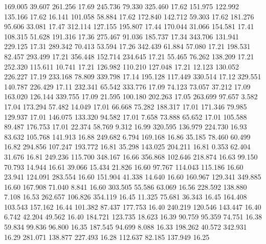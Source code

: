  169.005   39.607  261.256        17.69
 245.736   79.330  325.460        17.62
 151.975  122.992  135.166        17.62
  16.141  101.058   58.884        17.62
 172.840  142.712   59.303        17.62
 181.276   95.606   33.081        17.47
 312.114  127.155  195.807        17.44
 170.044   31.066  154.581        17.41
 108.315   51.628  191.316        17.36
 275.467   91.036  185.737        17.34
 343.706  131.941  229.125        17.31
 289.342   70.413   53.594        17.26
 342.439   61.884   57.080        17.21
 198.531   82.457  293.499        17.21
 356.448  152.714  234.645        17.21
  55.465   76.262  138.209        17.21
 252.320  115.611   10.741        17.21
 126.982  110.210  127.048        17.21
  12.123  130.052  226.227        17.19
 233.168   78.809  339.798        17.14
 195.128  117.449  330.514        17.12
 329.551  140.787  226.429        17.11
 232.341   65.542  333.776        17.09
  74.123   73.057   37.212        17.09
 163.020  126.144  339.755        17.09
  21.595  100.180  202.263        17.05
 263.699   97.657    3.582        17.04
 173.294   57.482   14.049        17.01
  66.668   75.282  188.317        17.01
 171.346   79.985  129.937        17.01
 146.075  133.320   94.582        17.01
   7.658   73.888   65.652        17.01
 105.588   89.487  176.753        17.01
  22.374   58.769    9.312        16.99
 320.595  136.979  224.730        16.93
  83.632  105.768  141.913        16.88
 249.682    6.794  169.168        16.86
  35.185   78.460   60.499        16.82
 294.856  107.247  193.772        16.81
  35.298  143.025  204.211        16.81
   0.353   62.404   31.676        16.81
 249.236  115.700  348.167        16.66
 356.868  102.646  218.874        16.63
  99.150   70.793   14.944        16.61
  39.066   15.434   21.826        16.60
  97.767  114.043  115.186        16.60
  23.941  124.091  283.554        16.60
 151.904   41.338   14.640        16.60
 160.967  129.341  349.885        16.60
 167.908   71.040    8.841        16.60
 303.505   55.586   63.069        16.56
 228.592  138.880    7.108        16.53
 262.657  106.826  354.119        16.45
  11.325   75.681   36.343        16.45
 164.408  103.543  157.162        16.44
 101.382   87.437  177.753        16.40
 240.219  120.546  143.447        16.40
   6.742   42.204   49.562        16.40
 184.721  123.735   18.623        16.39
  90.759   95.359   74.751        16.38
  59.834   99.836   96.800        16.35
 187.545   94.699    8.088        16.33
 198.262   40.572  342.931        16.29
 281.071  138.877  227.493        16.28
 112.637   82.185  137.949        16.25

